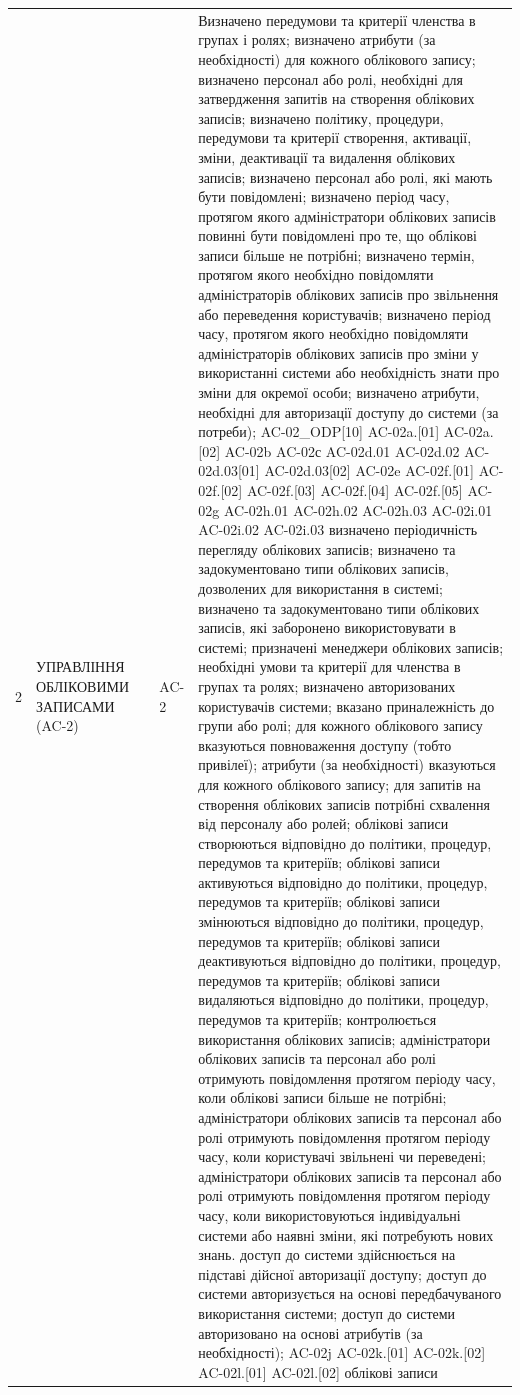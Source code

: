 \documentclass[10pt]{article}
\begin{document}
\begin{longtable}{|c|>{\raggedright\arraybackslash}p{4cm}|>{\raggedright\arraybackslash}p{2.5cm}|>{\raggedright\arraybackslash}p{3.5cm}|>{\raggedright\arraybackslash}p{5.5cm}|}
2 & УПРАВЛІННЯ ОБЛІКОВИМИ ЗАПИСАМИ (AC-2) &  & AC-2 & Визначено передумови та критерії членства в групах і ролях; визначено атрибути (за необхідності) для кожного облікового запису; визначено персонал або ролі, необхідні для затвердження запитів на створення облікових записів; визначено політику, процедури, передумови та критерії створення, активації, зміни, деактивації та видалення облікових записів; визначено персонал або ролі, які мають бути повідомлені; визначено період часу, протягом якого адміністратори облікових записів повинні бути повідомлені про те, що облікові записи більше не потрібні; визначено термін, протягом якого необхідно повідомляти адміністраторів облікових записів про звільнення або переведення користувачів; визначено період часу, протягом якого необхідно повідомляти адміністраторів облікових записів про зміни у використанні системи або необхідність знати про зміни для окремої особи; визначено атрибути, необхідні для авторизації доступу до системи (за потреби); AC-02\_\allowbreak{}ODP[10] AC-02a.[01] AC-02a.[02] AC-02b AC-02с AC-02d.01 AC-02d.02 AC-02d.03[01] AC-02d.03[02] AC-02e AC-02f.[01] AC-02f.[02] AC-02f.[03] AC-02f.[04] AC-02f.[05] AC-02g AC-02h.01 AC-02h.02 AC-02h.03 AC-02i.01 AC-02i.02 AC-02i.03 визначено періодичність перегляду облікових записів; визначено та задокументовано типи облікових записів, дозволених для використання в системі; визначено та задокументовано типи облікових записів, які заборонено використовувати в системі; призначені менеджери облікових записів; необхідні умови та критерії для членства в групах та ролях; визначено авторизованих користувачів системи; вказано приналежність до групи або ролі; для кожного облікового запису вказуються повноваження доступу (тобто привілеї); атрибути (за необхідності) вказуються для кожного облікового запису; для запитів на створення облікових записів потрібні схвалення від персоналу або ролей; облікові записи створюються відповідно до політики, процедур, передумов та критеріїв; облікові записи активуються відповідно до політики, процедур, передумов та критеріїв; облікові записи змінюються відповідно до політики, процедур, передумов та критеріїв; облікові записи деактивуються відповідно до політики, процедур, передумов та критеріїв; облікові записи видаляються відповідно до політики, процедур, передумов та критеріїв; контролюється використання облікових записів; адміністратори облікових записів та персонал або ролі отримують повідомлення протягом періоду часу, коли облікові записи більше не потрібні; адміністратори облікових записів та персонал або ролі отримують повідомлення протягом періоду часу, коли користувачі звільнені чи переведені; адміністратори облікових записів та персонал або ролі отримують повідомлення протягом періоду часу, коли використовуються індивідуальні системи або наявні зміни, які потребують нових знань. доступ до системи здійснюється на підставі дійсної авторизації доступу; доступ до системи авторизується на основі передбачуваного використання системи; доступ до системи авторизовано на основі атрибутів (за необхідності); AC-02j AC-02k.[01] AC-02k.[02] AC-02l.[01] AC-02l.[02] облікові записи 
\end{longtable}
\end{document}
